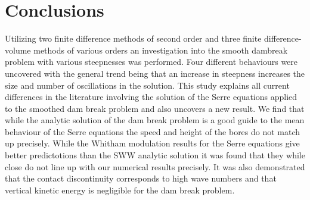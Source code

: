 \documentclass[SingleSpace,12pt,Proceedings]{Serre_ASCE}
\begin{document}
\section{Conclusions}
\label{section:Conclusions}
Utilizing two finite difference methods of second order and three finite difference-volume methods of various orders an investigation into the smooth dambreak problem with various steepnesses was performed. Four different behaviours were uncovered with the general trend being that an increase in steepness increases the size and number of oscillations in the solution. This study explains all current differences in the literature involving the solution of the Serre equations applied to the smoothed dam break problem and also uncovers a new result. We find that while the analytic solution of the dam break problem is a good guide to the mean behaviour of the Serre equations the speed and height of the bores do not match up precisely. While the Whitham modulation results for the Serre equations give better predictotions than the SWW analytic solution it was found that they while close do not line up with our numerical results precisely. It was also demonstrated that the contact discontinuity corresponds to high wave numbers and that vertical kinetic energy is negligible for the dam break problem. 



\end{document}
